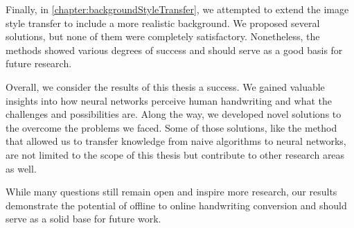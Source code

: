 Finally, in \cref{chapter:backgroundStyleTransfer}, we attempted to extend the image style transfer to include a more realistic background. We proposed several solutions, but none of them were completely satisfactory. Nonetheless, the methods showed various degrees of success and should serve as a good basis for future research.

Overall, we consider the results of this thesis a success. We gained valuable insights into how neural networks perceive human handwriting and what the challenges and possibilities are. Along the way, we developed novel solutions to the overcome the problems we faced. Some of those solutions, like the method that allowed us to transfer knowledge from naive algorithms to neural networks, are not limited to the scope of this thesis but contribute to other research areas as well.

While many questions still remain open and inspire more research, our results demonstrate the potential of offline to online handwriting conversion and should serve as a solid base for future work.
